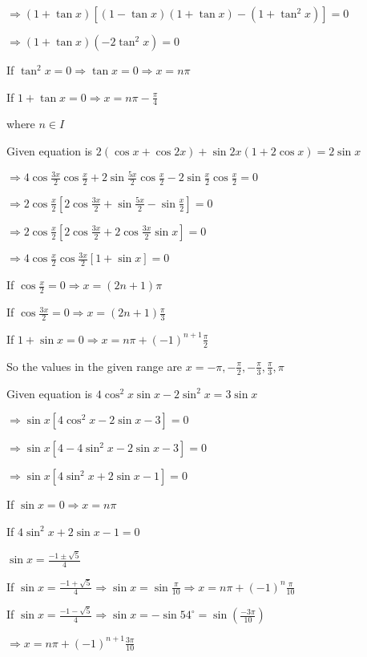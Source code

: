   $\Rightarrow (1 + \tan x)[(1 - \tan x)(1 + \tan x) - (1 + \tan^2x)] = 0$

  $\Rightarrow (1 + \tan x)(-2\tan^2x) = 0$

  If $\tan^2x = 0 \Rightarrow \tan x = 0\Rightarrow x = n\pi$

  If $1 + \tan x = 0 \Rightarrow x = n\pi - \frac{\pi}{4}$

  where $n \in I$

\item Given equation is $2(\cos x + \cos2x) + \sin2x(1 + 2\cos x) = 2\sin x$

  $\Rightarrow 4\cos\frac{3x}{2}\cos\frac{x}{2} + 2\sin\frac{5x}{2}\cos\frac{x}{2} - 2\sin\frac{x}{2}\cos\frac{x}{2} = 0$

  $\Rightarrow 2\cos\frac{x}{2}\left[2\cos\frac{3x}{2} + \sin\frac{5x}{2} - \sin\frac{x}{2}\right] = 0$

  $\Rightarrow 2\cos\frac{x}{2}\left[2\cos\frac{3x}{2} + 2\cos\frac{3x}{2}\sin x\right] = 0$

  $\Rightarrow 4\cos\frac{x}{2}\cos\frac{3x}{2}[1 + \sin x] = 0$

  If $\cos\frac{x}{2} = 0 \Rightarrow x = (2n + 1)\pi$

  If $\cos\frac{3x}{2} = 0 \Rightarrow x = (2n + 1)\frac{\pi}{3}$

  If $1 + \sin x = 0 \Rightarrow x = n\pi + (-1)^{n + 1}\frac{\pi}{2}$

  So the values in the given range are $x = -\pi, -\frac{\pi}{2}, -\frac{\pi}{3}, \frac{\pi}{3}, \pi$

\item Given equation is $4\cos^2x\sin x - 2\sin^2x = 3\sin x$

  $\Rightarrow \sin x[4\cos^2x - 2\sin x - 3] = 0$

  $\Rightarrow \sin x[4 - 4\sin^2x - 2\sin x - 3] = 0$

  $\Rightarrow \sin x[4\sin^2x + 2\sin x - 1] = 0$

  If $\sin x = 0 \Rightarrow x = n\pi$

  If $4\sin^2x + 2\sin x - 1 = 0$

  $\sin x = \frac{-1\pm\sqrt{5}}{4}$

  If $\sin x = \frac{-1 + \sqrt{5}}{4} \Rightarrow \sin x = \sin\frac{\pi}{10} \Rightarrow x = n\pi + (-1)^n\frac{\pi}{10}$

  If $\sin x = \frac{-1 - \sqrt{5}}{4}\Rightarrow \sin x = -\sin54^\circ = \sin\left(\frac{-3\pi}{10}\right)$

  $\Rightarrow x = n\pi + (-1)^{n + 1}\frac{3\pi}{10}$

